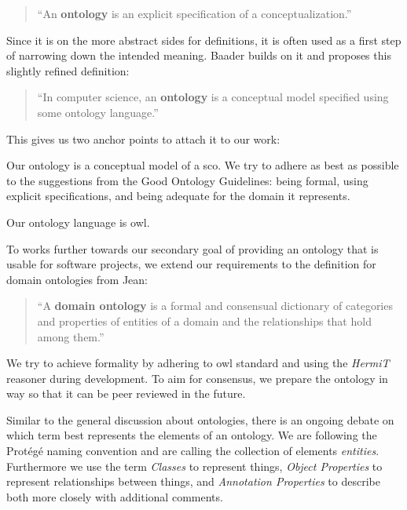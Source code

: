 \documentclass[a4paper, DIV=13, BCOR=0cm]{scrbook}
\begin{document}
\begin{quote}
	\enquote{An \textbf{ontology} is an explicit specification of a conceptualization.} \cite[p.\, 1]{gruber1993translation}
\end{quote}

Since it is on the more abstract sides for definitions, it is often used as a first step of narrowing down the intended meaning. Baader builds on it and proposes this slightly refined definition:

\begin{quote}
	\enquote{In computer science, an \textbf{ontology} is a conceptual model specified using some ontology language.} \cite[p.\,205]{baader2017introduction}
\end{quote}

This gives us two anchor points to attach it to our work:
\begin{inparaenum}
	\item Our ontology is a conceptual model of a \gls{sco}. We try to adhere as best as possible to the suggestions from the Good Ontology Guidelines: being formal, using explicit specifications, and being adequate for the domain it represents. \cite[p.\,10]{schulz2012guideline}
	\item Our ontology language is \gls{owl}.
\end{inparaenum}

To works further towards our secondary goal of providing an ontology that is usable for software projects, we extend our requirements to the definition for domain ontologies from Jean: 

\begin{quote}
	\enquote{A \textbf{domain ontology }is a formal and consensual dictionary of categories and properties of entities of a domain and the relationships that hold among them.} \cite[p.\,240]{Jean_2007}
\end{quote}

We try to achieve formality by adhering to \gls{owl} standard and using the \textit{HermiT} reasoner during development. To aim for consensus, we prepare the ontology in way so that it can be peer reviewed in the future.

Similar to the general discussion about ontologies, there is an ongoing debate on which term best represents the elements of an ontology. We are following the Protégé naming convention and are calling the collection of elements \textit{entities}. Furthermore we use the term \textit{Classes} to represent things, \textit{Object Properties} to represent relationships between things, and \textit{Annotation Properties} to describe both more closely with additional comments.
\end{document}
